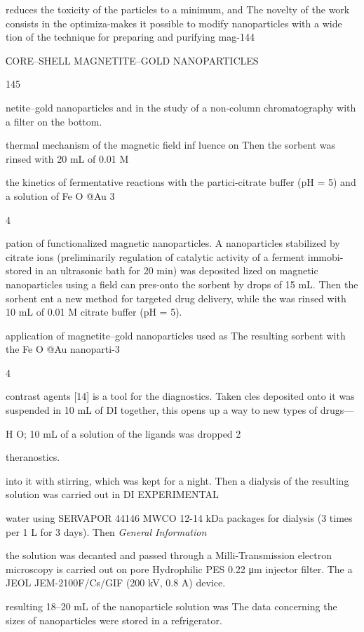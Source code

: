 \documentclass[12pt,a4paper]{article}
\begin{document}
reduces the toxicity of the particles to a minimum, and The novelty of
the work consists in the optimiza-makes it possible to modify
nanoparticles with a wide tion of the technique for preparing and
purifying mag-144

СORE--SHELL MAGNETITE--GOLD NANOPARTICLES

145

netite--gold nanoparticles and in the study of a non-column
chromatography with a filter on the bottom.

thermal mechanism of the magnetic field inf luence on Then the sorbent
was rinsed with 20 mL of 0.01 M

the kinetics of fermentative reactions with the partici-citrate buffer
(pH = 5) and a solution of Fe O @Au 3

4

pation of functionalized magnetic nanoparticles. A nanoparticles
stabilized by citrate ions (preliminarily regulation of catalytic
activity of a ferment immobi-stored in an ultrasonic bath for 20 min)
was deposited lized on magnetic nanoparticles using a field can
pres-onto the sorbent by drops of 15 mL. Then the sorbent ent a new
method for targeted drug delivery, while the was rinsed with 10 mL of
0.01 M citrate buffer (pH = 5).

application of magnetite--gold nanoparticles used as The resulting
sorbent with the Fe O @Au nanoparti-3

4

contrast agents {[}14{]} is a tool for the diagnostics. Taken cles
deposited onto it was suspended in 10 mL of DI together, this opens up a
way to new types of drugs---

H O; 10 mL of a solution of the ligands was dropped 2

theranostics.

into it with stirring, which was kept for a night. Then a dialysis of
the resulting solution was carried out in DI EXPERIMENTAL

water using SERVAPOR 44146 MWCO 12-14 kDa packages for dialysis (3 times
per 1 L for 3 days). Then \emph{General Information}

the solution was decanted and passed through a Milli-Transmission
electron microscopy is carried out on pore Hydrophilic PES 0.22 μm
injector filter. The a JEOL JEM-2100F/Cs/GIF (200 kV, 0.8 A) device.

resulting 18--20 mL of the nanoparticle solution was The data concerning
the sizes of nanoparticles were stored in a refrigerator.
\end{document}
